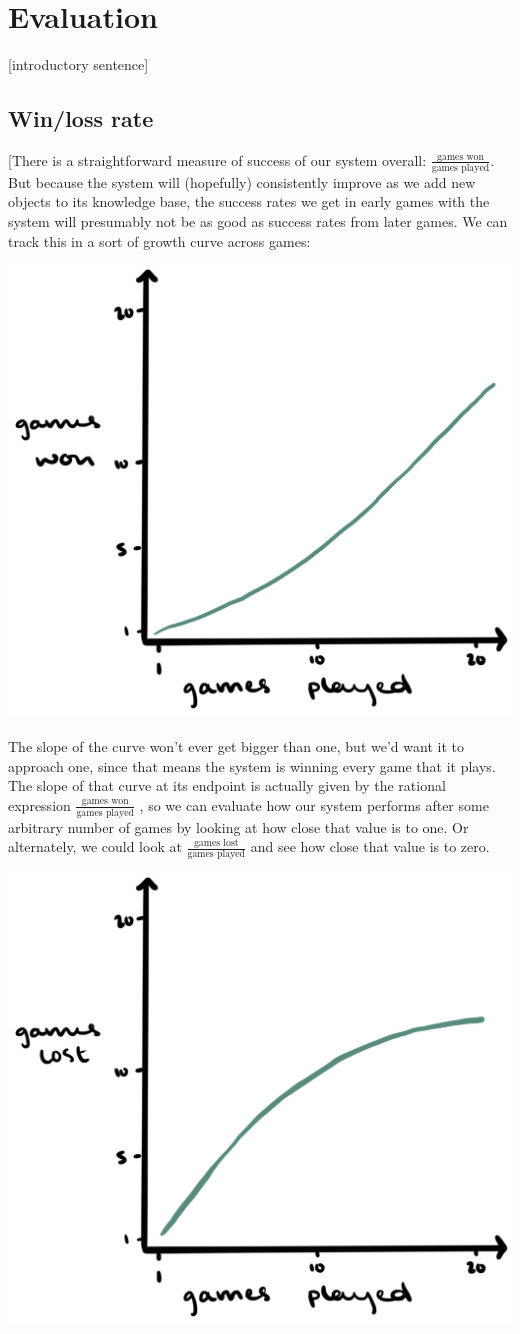 \documentclass[11pt,a4paper]{article}
\begin{document}
\section{Evaluation}
\label{sec:eval}

[introductory sentence]

\subsection{Win/loss rate}

[There is a straightforward measure of success of our system overall: $\frac{\text{games won}}{\text{games played}}$.
But because the system will (hopefully) consistently improve as we add new objects to its knowledge base, the success rates we get in early games with the system will presumably not be as good as success rates from later games. 
We can track this in a sort of growth curve across games:

\begin{center}
	\includegraphics[width=.5\linewidth]{graphics/growth-curve.png}
\end{center}

The slope of the curve won't ever get bigger than one, but we'd want it to approach one, since that means the system is winning every game that it plays.
The slope of that curve at its endpoint is actually given by the rational expression $\frac{\text{games won}}{\text{games played}}$ \citep[50--51]{Baayen2001}, so we can evaluate how our system performs after some arbitrary number of games by looking at how close that value is to one.
Or alternately, we could look at $\frac{\text{games lost}}{\text{games played}}$ and see how close that value is to zero.
\begin{center}
	\includegraphics[width=.5\linewidth]{graphics/growth-curve2.png}
\end{center}
\end{document}
